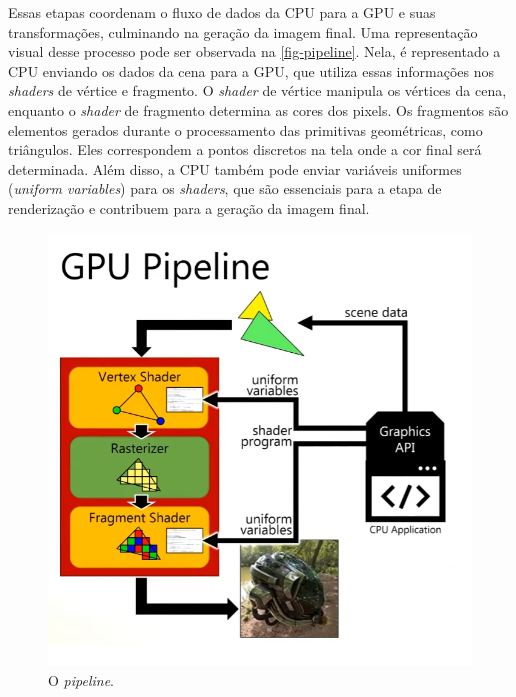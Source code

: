 \documentclass[english, 
               brazil, 
               bsc] %
               {dcomp-abntex2}
\begin{document}


Essas etapas coordenam o fluxo de dados da CPU para a GPU e suas transformações, culminando na geração da imagem final. Uma representação visual desse processo pode ser observada na \autoref{fig-pipeline}. Nela, é representado a CPU enviando os dados da cena para a GPU, que utiliza essas informações nos \textit{shaders} de vértice e fragmento. O \textit{shader} de vértice manipula os vértices da cena, enquanto o \textit{shader} de fragmento determina as cores dos pixels. Os fragmentos são elementos gerados durante o processamento das primitivas geométricas, como triângulos. Eles correspondem a pontos discretos na tela onde a cor final será determinada. Além disso, a CPU também pode enviar variáveis uniformes (\textit{uniform variables}) para os \textit{shaders}, que são essenciais para a etapa de renderização e contribuem para a geração da imagem final.


\begin{figure}[H]
        \caption{\label{fig-pipeline}\small O \textit{pipeline}.}
        \begin{center}
            \includegraphics[scale=0.45]{./Imagens/gpu_pipeline.png}
        \end{center}
\end{figure}
\end{document}
